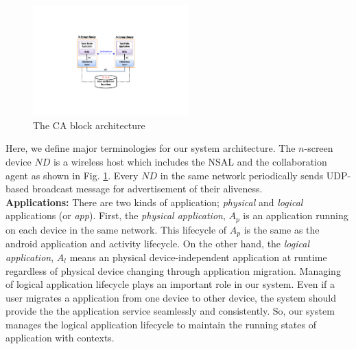 \documentclass{sig-alternate}
\begin{document}

    \begin{figure}[htb] %
    \centering
    \includegraphics[width=6cm,keepaspectratio]{basicmodel}
    \caption{The CA block architecture}
    \label{fig:basicmodel}
    \end{figure}


Here, we define major terminologies for our system architecture. The $n$-screen device $ND$ is a wireless host which includes the NSAL and the collaboration agent as shown in Fig. \ref{fig:basicmodel}.  Every $ND$ in the same network periodically sends UDP-based broadcast message for advertisement of their aliveness.
\\

\noindent
\textbf{Applications: }
There are two kinds of application; \textit{physical} and \textit{logical} applications (or \textit{app}).
First, the \textit{physical application}, $A_p$ is an application running on each device in the same network.  
This lifecycle of  $A_p$ is the same as the android application and activity lifecycle.
On the other hand, the \textit{logical application}, $A_l$ means an physical device-independent application at runtime regardless of physical device changing through application migration.
Managing of logical application lifecycle plays an important role in our system.
Even if a user migrates a application from one device to other device, 
the system should provide the the application service  seamlessly and consistently. 
So, our system manages the logical application lifecycle to maintain the running states of application with contexts.
\\
\end{document}
